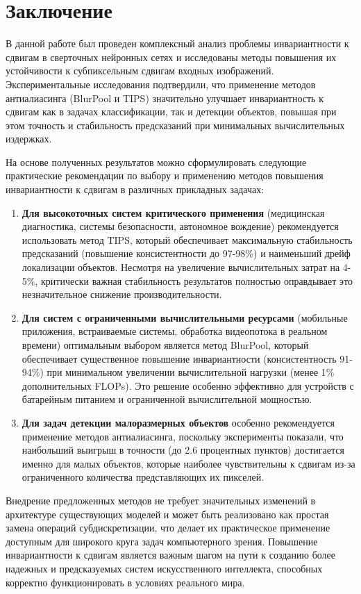 \section{Заключение}
\label{sec:Conclusion} 

В данной работе был проведен комплексный анализ проблемы инвариантности к сдвигам в сверточных нейронных сетях и исследованы методы повышения их устойчивости к субпиксельным сдвигам входных изображений. Экспериментальные исследования подтвердили, что применение методов антиалиасинга (BlurPool и TIPS) значительно улучшает инвариантность к сдвигам как в задачах классификации, так и детекции объектов, повышая при этом точность и стабильность предсказаний при минимальных вычислительных издержках.

На основе полученных результатов можно сформулировать следующие практические рекомендации по выбору и применению методов повышения инвариантности к сдвигам в различных прикладных задачах:

\begin{enumerate}
    \item \textbf{Для высокоточных систем критического применения} (медицинская диагностика, системы безопасности, автономное вождение) рекомендуется использовать метод TIPS, который обеспечивает максимальную стабильность предсказаний (повышение консистентности до 97-98\%) и наименьший дрейф локализации объектов. Несмотря на увеличение вычислительных затрат на 4-5\%, критически важная стабильность результатов полностью оправдывает это незначительное снижение производительности.
    
    \item \textbf{Для систем с ограниченными вычислительными ресурсами} (мобильные приложения, встраиваемые системы, обработка видеопотока в реальном времени) оптимальным выбором является метод BlurPool, который обеспечивает существенное повышение инвариантности (консистентность 91-94\%) при минимальном увеличении вычислительной нагрузки (менее 1\% дополнительных FLOPs). Это решение особенно эффективно для устройств с батарейным питанием и ограниченной вычислительной мощностью.
    
    \item \textbf{Для задач детекции малоразмерных объектов} особенно рекомендуется применение методов антиалиасинга, поскольку эксперименты показали, что наибольший выигрыш в точности (до 2.6 процентных пунктов) достигается именно для малых объектов, которые наиболее чувствительны к сдвигам из-за ограниченного количества представляющих их пикселей.
\end{enumerate}

Внедрение предложенных методов не требует значительных изменений в архитектуре существующих моделей и может быть реализовано как простая замена операций субдискретизации, что делает их практическое применение доступным для широкого круга задач компьютерного зрения. Повышение инвариантности к сдвигам является важным шагом на пути к созданию более надежных и предсказуемых систем искусственного интеллекта, способных корректно функционировать в условиях реального мира. 